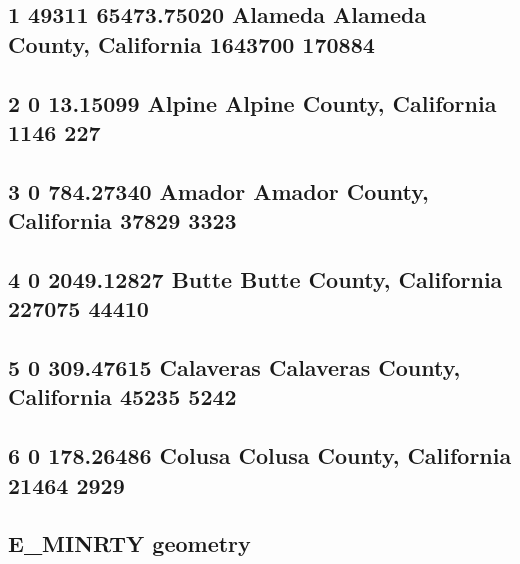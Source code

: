 \documentclass[
  12pt,
]{article}
\begin{document}
\hypertarget{alameda-alameda-county-california-1643700-170884}{%
\subsection{1 49311 65473.75020 Alameda Alameda County, California
1643700 170884}\label{alameda-alameda-county-california-1643700-170884}}

\hypertarget{alpine-alpine-county-california-1146-227}{%
\subsection{2 0 13.15099 Alpine Alpine County, California 1146
227}\label{alpine-alpine-county-california-1146-227}}

\hypertarget{amador-amador-county-california-37829-3323}{%
\subsection{3 0 784.27340 Amador Amador County, California 37829
3323}\label{amador-amador-county-california-37829-3323}}

\hypertarget{butte-butte-county-california-227075-44410}{%
\subsection{4 0 2049.12827 Butte Butte County, California 227075
44410}\label{butte-butte-county-california-227075-44410}}

\hypertarget{calaveras-calaveras-county-california-45235-5242}{%
\subsection{5 0 309.47615 Calaveras Calaveras County, California 45235
5242}\label{calaveras-calaveras-county-california-45235-5242}}

\hypertarget{colusa-colusa-county-california-21464-2929}{%
\subsection{6 0 178.26486 Colusa Colusa County, California 21464
2929}\label{colusa-colusa-county-california-21464-2929}}

\hypertarget{e_minrty-geometry}{%
\subsection{E\_MINRTY geometry}\label{e_minrty-geometry}}
\end{document}
